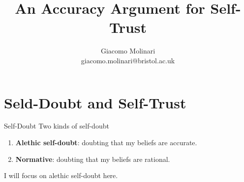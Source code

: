 \documentclass[aspectratio=169, dvipsnames]{beamer}
\title{An Accuracy Argument for Self-Trust}
\author{Giacomo Molinari\\giacomo.molinari@bristol.ac.uk}
\institute{University of Bristol}
\begin{document}
\maketitle


\section{Seld-Doubt and Self-Trust}

\begin{frame}{Self-Doubt}
  Two kinds of self-doubt
  \begin{enumerate}
  \item \textbf{Alethic self-doubt}: doubting that my beliefs are \alert{accurate}.
  \item \textbf{Normative}: doubting that my beliefs are \alert{rational}.
  \end{enumerate}
  I will focus on alethic self-doubt here.
\end{frame}
\end{document}
